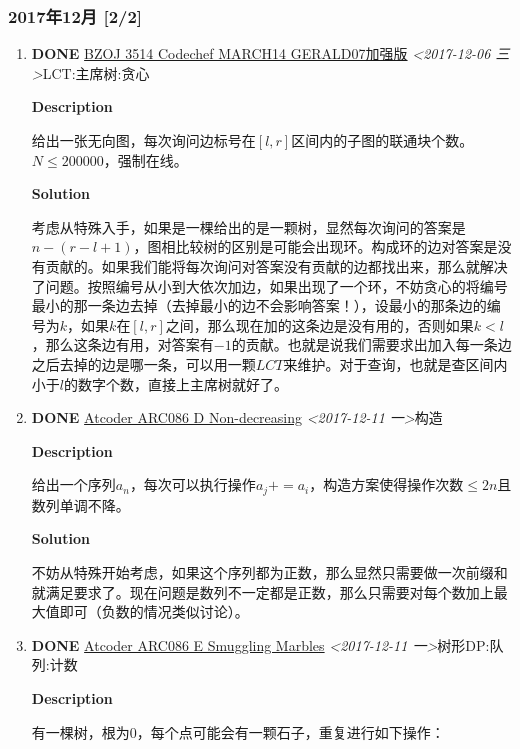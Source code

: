 \documentclass[11pt]{article}
\begin{document}
\subsubsection{2017年12月 [2/2]}
\label{sec:orgbf40e97}
\begin{enumerate}
\item {\bfseries\sffamily DONE} \href{http://www.lydsy.com/JudgeOnline/problem.php?id=3514}{BZOJ 3514 Codechef MARCH14 GERALD07加强版} \textit{<2017-12-06 三>}\hfill{}\textsc{LCT:主席树:贪心}
\label{sec:orga110002}

\textbf{Description}

给出一张无向图，每次询问边标号在\([l,r]\)区间内的子图的联通块个数。\(N \leq 200000\)，强制在线。

\textbf{Solution}

考虑从特殊入手，如果是一棵给出的是一颗树，显然每次询问的答案是\(n-(r-l+1)\)，图相比较树的区别是可能会出现环。构成环的边对答案是没有贡献的。如果我们能将每次询问对答案没有贡献的边都找出来，那么就解决了问题。按照编号从小到大依次加边，如果出现了一个环，不妨贪心的将编号最小的那一条边去掉（去掉最小的边不会影响答案！），设最小的那条边的编号为\(k\)，如果\(k\)在\([l,r]\)之间，那么现在加的这条边是没有用的，否则如果\(k < l\)，那么这条边有用，对答案有\(-1\)的贡献。也就是说我们需要求出加入每一条边之后去掉的边是哪一条，可以用一颗\(LCT\)来维护。对于查询，也就是查区间内小于\(l\)的数字个数，直接上主席树就好了。

\item {\bfseries\sffamily DONE} \href{https://arc086.contest.atcoder.jp/tasks/arc086\_b}{Atcoder ARC086 D Non-decreasing} \textit{<2017-12-11 一>}\hfill{}\textsc{构造}
\label{sec:orga32d33e}

\textbf{Description}

给出一个序列\(a_n\)，每次可以执行操作\(a_j += a_i\)，构造方案使得操作次数\(\leq 2n\)且数列单调不降。

\textbf{Solution}

不妨从特殊开始考虑，如果这个序列都为正数，那么显然只需要做一次前缀和就满足要求了。现在问题是数列不一定都是正数，那么只需要对每个数加上最大值即可（负数的情况类似讨论）。

\item {\bfseries\sffamily DONE} \href{https://arc086.contest.atcoder.jp/tasks/arc086\_c}{Atcoder ARC086 E Smuggling Marbles} \textit{<2017-12-11 一>}\hfill{}\textsc{树形DP:队列:计数}
\label{sec:org1253cb0}

\textbf{Description}

有一棵树，根为\(0\)，每个点可能会有一颗石子，重复进行如下操作：


\end{enumerate}
\end{document}
